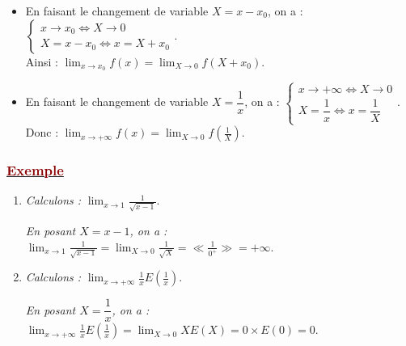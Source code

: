\documentclass[12pt,a4paper]{article}
\begin{document}
\begin{itemize}
    \item En faisant le changement de variable $X = x - x_0$, on a : 
    $\begin{cases}
        x \to x_0 \iff X \to 0 \\
        X = x - x_0 \iff x = X + x_0
    \end{cases}.$ \\
    Ainsi : $\displaystyle \lim_{x \to x_0} f(x) = \lim_{X \to 0} f(X + x_0)$.

    \vspace{0.3cm}

    \item En faisant le changement de variable $X = \dfrac{1}{x}$, on a : 
    $\begin{cases}
        x \to +\infty \iff X \to 0 \\
        X = \dfrac{1}{x} \iff x = \dfrac{1}{X}
    \end{cases}.$ \\
    Donc : $\displaystyle \lim_{x \to +\infty} f(x) = \lim_{X \to 0} f\left(\frac{1}{X}\right)$.
\end{itemize}

\subsubsection*{\underline{\textcolor{darkred}{ Exemple }}}

\vspace{0.2cm}

\begin{enumerate}
    \item \textit{Calculons : } $\displaystyle \lim_{x \to 1} \frac{1}{\sqrt{x - 1}}$.
    
    \vspace{0.1cm}
    
    \textit{En posant $X = x - 1$, on a : } 
    $\displaystyle \lim_{x \to 1} \frac{1}{\sqrt{x - 1}} = \lim_{X \to 0} \frac{1}{\sqrt{X}} = \ll \frac{1}{0^+} \gg = +\infty$.

    \vspace{0.2cm}

    \hfil {} \hfil

    \vspace{0.6cm}

    \item \textit{Calculons : } $\displaystyle \lim_{x \to +\infty} \frac{1}{x} E\left(\frac{1}{x}\right)$.

    \vspace{0.1cm}

    \textit{En posant $X = \dfrac{1}{x}$, on a : } 
    $\displaystyle \lim_{x \to +\infty} \frac{1}{x} E\left(\frac{1}{x}\right) = \lim_{X \to 0} X E(X) = 0 \times E(0) = 0$.

    \vspace{0.2cm}

    \hfil {} \hfil
\end{enumerate}
\end{document}
